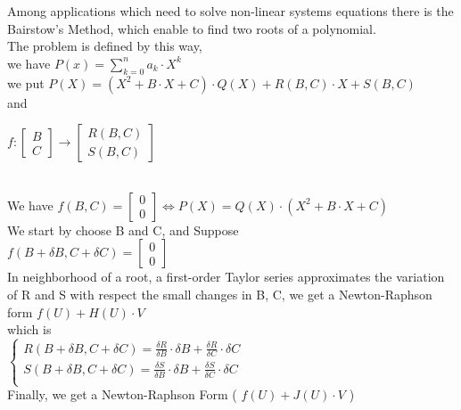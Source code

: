 \documentclass[22pt]{report}
\begin{document}
Among applications which need to solve non-linear systems equations there is the Bairstow's Method, which enable to find two roots of a polynomial. \\
The problem is defined by this way, \\
we have $ P(x) = \sum_{k=0}^{n} a_k \cdot X^k$ \\
we put $ P(X) = (X^2 + B \cdot X + C) \cdot Q(X) + R(B,C) \cdot X + S(B,C)$
\\ and 

$f: \left[ \begin{array}{ccc}
    B \\
    C 
    \end{array} \right] \to 
\left[ \begin{array}{ccc}
  R(B,C) \\
  S(B,C) 
\end{array} \right]  $

\\
We have 
 $ f(B,C) = \left[ \begin{array}{ccc}
    0 \\
    0
    \end{array} \right] \Leftrightarrow P(X) = Q(X) \cdot (X^2 + B \cdot X + C)  $
\\ 
We start by choose B and C, and Suppose \\
$f(B + \delta B, C + \delta C) =  \left[ \begin{array}{ccc}
    0 \\
    0
    \end{array} \right]$
\\
In neighborhood of a root, a first-order Taylor series approximates the variation of R and S with respect the small changes  in B, C, we get a Newton-Raphson form  $ f(U) + H(U) \cdot V$ \\
which is\\ 

$ \begin{cases}
    R(B + \delta B, C + \delta C) = \frac{\delta R}{\delta B} \cdot \delta B + \frac{\delta R}{\delta C} \cdot \delta C   \\
S(B + \delta B, C + \delta C) = \frac{\delta S}{\delta B} \cdot \delta B + \frac{\delta S}{\delta C} \cdot \delta C   \\    
\end{cases}    
  $ \\

Finally, we get a Newton-Raphson Form ( $f(U) + J(U)\cdot V$ ) \\
\end{document}
